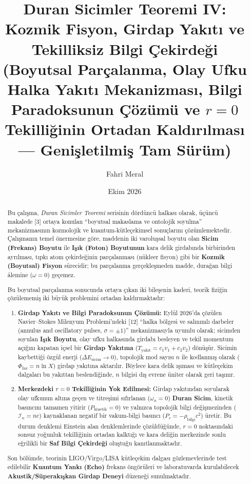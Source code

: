\documentclass[12pt,a4paper]{article}
\title{\textbf{Duran Sicimler Teoremi IV: Kozmik Fisyon, Girdap Yakıtı ve Tekilliksiz Bilgi Çekirdeği} \\[0.3cm]
\large (Boyutsal Parçalanma, Olay Ufku Halka Yakıtı Mekanizması, Bilgi Paradoksunun Çözümü ve $r=0$ Tekilliğinin Ortadan Kaldırılması — Genişletilmiş Tam Sürüm)}
\author{Fahri Meral}
\date{Ekim 2026}
\begin{document}
\shorthandoff{=}

\maketitle

\begin{abstract}
Bu çalışma, \textit{Duran Sicimler Teoremi} serisinin dördüncü halkası olarak, üçüncü makalede [3] ortaya konulan ``boyutsal makaslama ve ontolojik soyulma'' mekanizmasının kozmolojik ve kuantum-kütleçekimsel sonuçlarını çözümlemektedir. Çalışmanın temel önermesine göre, maddenin iki varoluşsal boyutu olan \textbf{Sicim (Frekans) Boyutu} ile \textbf{Işık (Foton) Boyutunun} kara delik girdabında birbirinden ayrılması, tıpkı atom çekirdeğinin parçalanması (nükleer fisyon) gibi bir \textbf{Kozmik (Boyutsal) Fisyon} sürecidir; bu parçalanma gerçekleşmeden madde, durağan bilgi âlemine ($\omega = 0$) geçemez.

Bu boyutsal parçalanma sonucunda ortaya çıkan iki bileşenin kaderi, teorik fiziğin çözülememiş iki büyük problemini ortadan kaldırmaktadır:
\begin{enumerate}
    \item \textbf{Girdap Yakıtı ve Bilgi Paradoksunun Çözümü:} Eylül 2026'da çözülen Navier--Stokes Milenyum Problemi'ndeki [12] ``halka bölgesi ve salınımlı darbeler (annulus and oscillatory pulses, $\sigma = \pm 1$)'' mekanizmasıyla uyumlu olarak; sicimden soyulan \textbf{Işık Boyutu}, olay ufku halkasında girdabı besleyen ve tekil momentum açığını kapatan içsel bir \textbf{Girdap Yakıtına} ($T_{\text{yakıt}} = c_1 v_1 + c_2 v_2$) dönüşür. Sicimin kaybettiği özgül enerji ($\Delta E_{\text{sicim}} \to 0$), topolojik mod sayısı $n$ ile kodlanmış olarak ($\Phi_{\text{faz}} = n \ln X$) girdap yakıtına aktarılır. Böylece kara delik ışıması ve kütleçekim dalgaları bu yakıttan beslendiğinde, $n$ bilgisi dış evrene üniter olarak geri taşınır.
    \item \textbf{Merkezdeki $r=0$ Tekilliğinin Yok Edilmesi:} Girdap yakıtından soyularak olay ufkunun altına geçen ve titreşimi sıfırlanan ($\omega_n = 0$) \textbf{Duran Sicim}, kinetik basıncını tamamen yitirir ($P_{\text{kinetik}} = 0$) ve yalnızca topolojik bilgi değişmezinden ($\mathcal{I}_n = n c$) kaynaklanan negatif bir vakum-bilgi basıncı ($P_r = -\rho_{\text{bilgi}} c^2$) üretir. Bu durum denklemi Einstein alan denklemlerinde çözüldüğünde, $r=0$ noktasındaki sonsuz yoğunluk tekilliğinin ortadan kalktığı ve kara deliğin merkezinde sonlu eğrilikli bir \textbf{Saf Bilgi Çekirdeği} oluştuğu kanıtlanmaktadır.
\end{enumerate}
Son bölümde, teorinin LIGO/Virgo/LISA kütleçekim dalgası gözlemevlerinde test edilebilir \textbf{Kuantum Yankı (Echo)} frekans öngörüleri ve laboratuvarda kurulabilecek \textbf{Akustik/Süperakışkan Girdap Deneyi} düzeneği sunulmaktadır.
\end{abstract}
\end{document}
